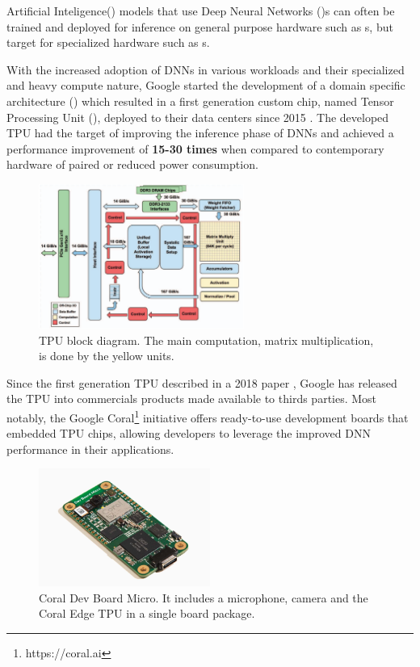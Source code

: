\documentclass[openright]{normas-utf-tex} %
\begin{document}
Artificial Inteligence() models that use Deep Neural 
Networks ()s can often be trained and deployed for inference
on general purpose hardware such as s, but target 
for specialized hardware such as s.

With the increased adoption of DNNs in various workloads and their specialized
and heavy compute nature, Google started the development of a domain specific
architecture () which resulted in a
first generation custom chip, named Tensor Processing Unit (), deployed to their data centers since 2015 \cite{Google2015}.
The developed TPU had the target of improving the inference phase of DNNs and
achieved a performance improvement of \textbf{15-30 times} when compared to
contemporary hardware of paired or reduced power consumption.

\begin{figure}[H]
	\centering
	\includegraphics[width=0.6\textwidth]{./images/tpublock.png}
	\caption[TPU block diagram]{TPU block diagram. The main computation, matrix multiplication, is done by the yellow units.}
	\label{fig:gauge1}
\end{figure}

Since the first generation TPU described in a 2018 paper \cite{Google2015},
Google has released the TPU into commercials products made available to thirds
parties. Most notably, the Google Coral\footnote{https://coral.ai} initiative
offers ready-to-use development boards that embedded TPU chips, allowing
developers to leverage the improved DNN performance in their applications.

\begin{figure}[H]
	\centering
	\includegraphics[width=0.5\textwidth]{./images/coralboard.png}
	\caption[Coral Dev Board Micro]{Coral Dev Board Micro. It includes a microphone, camera and the Coral Edge TPU in a single board package.}
\end{figure}
\end{document}
